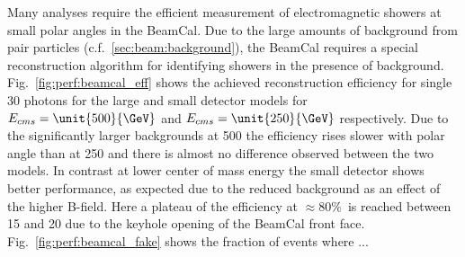 Many analyses require the efficient measurement of electromagnetic showers at small polar angles in the BeamCal.
Due to the large amounts of background from pair particles (c.f.~\ref{sec:beam:background}), the BeamCal requires a special reconstruction algorithm
for identifying showers in the presence of background.
Fig.~\ref{fig:perf:beamcal_eff} shows the achieved reconstruction efficiency for single \unit{30}{\GeV} photons for the large and small detector models
for $E_{cms}=\unit{500}{\GeV}$  and $E_{cms}=\unit{250}{\GeV}$ respectively. Due to the significantly larger backgrounds at \unit{500}{\GeV} the efficiency
rises slower with polar angle than at \unit{250}{\GeV} and there is almost no difference observed between the two models.
In contrast at lower center of mass energy the small detector shows better performance, as expected due to the reduced background as an effect of the
higher B-field. Here a plateau of the efficiency at $\approx 80\%$~is reached between \unit{15}{\mrad} and \unit{20}{\mrad} due to the keyhole opening
of the BeamCal front face.
Fig.~\ref{fig:perf:beamcal_fake} shows the fraction of events where ... 
%
%
